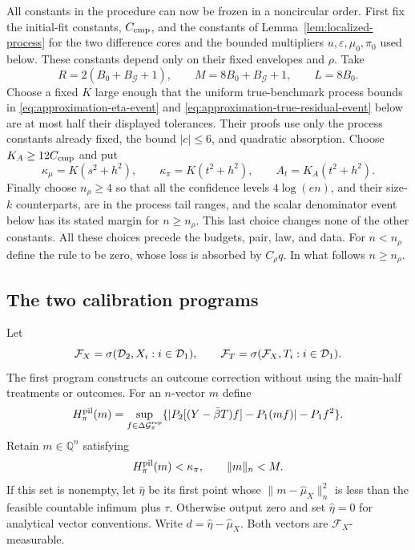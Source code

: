 All constants in the procedure can now be frozen in a noncircular order.
First fix the initial-fit constants, $C_{\rm cmp}$, and the constants
of Lemma~\ref{lem:localized-process} for the two difference cores and
the bounded multipliers $u,\varepsilon,\mu_0,\pi_0$ used below.
These constants depend only on their fixed envelopes and $\rho$.
Take
\[
 R=2(B_0+B_{\mathcal G}+1),\qquad
 M=8B_0+B_{\mathcal G}+1,\qquad L=8B_0.
\]
Choose a fixed $K$ large enough that the uniform true-benchmark
process bounds in \eqref{eq:approximation-eta-event} and
\eqref{eq:approximation-true-residual-event} below are at most half
their displayed tolerances. Their proofs use only the process constants
already fixed, the bound $|c|\le6$, and quadratic absorption.
Choose $K_A\ge12C_{\rm cmp}$ and put
\begin{equation}
 \kappa_\mu=K(s^2+h^2),\qquad
 \kappa_\pi=K(t^2+h^2),\qquad A_t=K_A(t^2+h^2).
 \label{eq:approximation-tolerances}
\end{equation}
Finally choose $n_\rho\ge4$ so that all the confidence levels
$4\log(en)$, and their size-$k$ counterparts, are in the process
tail ranges, and the scalar denominator event below has its stated
margin for $n\ge n_\rho$. This last choice changes none of the other
constants. All these choices precede the budgets, pair, law, and data.
For $n<n_\rho$ define the rule to be zero, whose loss is absorbed by
$C_\rho q$. In what follows $n\ge n_\rho$.

\subsection{The two calibration programs}
\label{app:approximation-programs}

Let
\[
 \mathcal F_X=\sigma(\mathcal D_2,X_i:i\in\mathcal D_1),\qquad
 \mathcal F_T=\sigma(\mathcal F_X,T_i:i\in\mathcal D_1).
\]
The first program constructs an outcome correction without using the
main-half treatments or outcomes. For an $n$-vector $m$ define
\[
 H^{\rm pil}_\pi(m)=
 \sup_{f\in\Delta\mathcal G_\pi^{\rm rep}}
 \{|P_2[(Y-\bar\beta T)f]-P_1(mf)|-P_1f^2\}.
\]
Retain $m\in\mathbb Q^n$ satisfying
\begin{equation}
 H^{\rm pil}_\pi(m)<\kappa_\pi,\qquad \|m\|_n<M.
 \label{eq:approximation-eta-program}
\end{equation}
If this set is nonempty, let $\widehat\eta$ be its first point whose
$\|m-\widehat\mu_X\|_n^2$ is less than the feasible countable
infimum plus $\tau$. Otherwise output zero and set $\widehat\eta=0$
for analytical vector conventions. Write
$d=\widehat\eta-\widehat\mu_X$. Both vectors are
$\mathcal F_X$-measurable.

